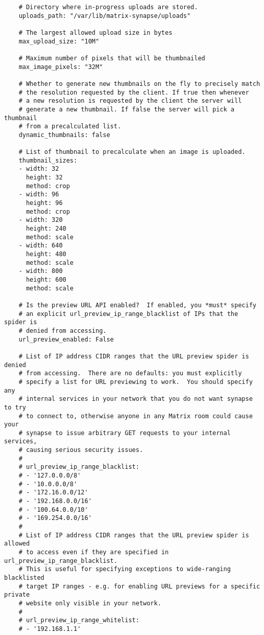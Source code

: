 \begin{lstlisting}
    # Directory where in-progress uploads are stored.
    uploads_path: "/var/lib/matrix-synapse/uploads"
    
    # The largest allowed upload size in bytes
    max_upload_size: "10M"
    
    # Maximum number of pixels that will be thumbnailed
    max_image_pixels: "32M"
    
    # Whether to generate new thumbnails on the fly to precisely match
    # the resolution requested by the client. If true then whenever
    # a new resolution is requested by the client the server will
    # generate a new thumbnail. If false the server will pick a thumbnail
    # from a precalculated list.
    dynamic_thumbnails: false
    
    # List of thumbnail to precalculate when an image is uploaded.
    thumbnail_sizes:
    - width: 32
      height: 32
      method: crop
    - width: 96
      height: 96
      method: crop
    - width: 320
      height: 240
      method: scale
    - width: 640
      height: 480
      method: scale
    - width: 800
      height: 600
      method: scale
    
    # Is the preview URL API enabled?  If enabled, you *must* specify
    # an explicit url_preview_ip_range_blacklist of IPs that the spider is
    # denied from accessing.
    url_preview_enabled: False
    
    # List of IP address CIDR ranges that the URL preview spider is denied
    # from accessing.  There are no defaults: you must explicitly
    # specify a list for URL previewing to work.  You should specify any
    # internal services in your network that you do not want synapse to try
    # to connect to, otherwise anyone in any Matrix room could cause your
    # synapse to issue arbitrary GET requests to your internal services,
    # causing serious security issues.
    #
    # url_preview_ip_range_blacklist:
    # - '127.0.0.0/8'
    # - '10.0.0.0/8'
    # - '172.16.0.0/12'
    # - '192.168.0.0/16'
    # - '100.64.0.0/10'
    # - '169.254.0.0/16'
    #
    # List of IP address CIDR ranges that the URL preview spider is allowed
    # to access even if they are specified in url_preview_ip_range_blacklist.
    # This is useful for specifying exceptions to wide-ranging blacklisted
    # target IP ranges - e.g. for enabling URL previews for a specific private
    # website only visible in your network.
    #
    # url_preview_ip_range_whitelist:
    # - '192.168.1.1'
    

\end{lstlisting}
